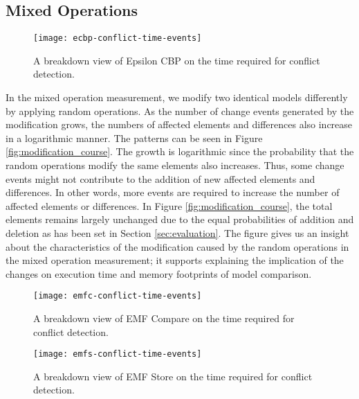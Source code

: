\vspace{-5pt}
\subsection{Mixed Operations}
\label{sec:mixed-operation_conflict}

\begin{wrapfigure}[14]{r}{0.5\textwidth}
  \vspace{-5pt}
  \texttt{[image: ecbp-conflict-time-events]}
  \caption{A breakdown view of Epsilon CBP on the time required for conflict detection.}
  \label{fig:ecbp-conflict-time-events}
\end{wrapfigure}

In the mixed operation measurement, we modify two identical models differently by applying random operations. As the number of change events generated by the modification grows, the numbers of affected elements and differences also increase in a logarithmic manner. The patterns can be seen in Figure \ref{fig:modification_course}. The growth is logarithmic since the probability that the random operations modify the same elements also increases. Thus, some change events might not contribute to the addition of new affected elements and differences. In other words, more events are required to increase the number of affected elements or differences. In Figure \ref{fig:modification_course}, the total elements remains largely unchanged due to the equal probabilities of addition and deletion as has been set in Section \ref{sec:evaluation}. The figure gives us an insight about the characteristics of the modification caused by the random operations in the mixed operation measurement; it supports explaining the implication of the changes on execution time and memory footprints of model comparison.

\begin{figure}[ht]
  \centering
  \begin{minipage}[b]{0.495\textwidth}
    \texttt{[image: emfc-conflict-time-events]}
    \caption{A breakdown view of EMF Compare on the time required for conflict detection.}
    \label{fig:emfc-conflict-time-events}
  \end{minipage}
  \hfill
  \begin{minipage}[b]{0.495\textwidth}
    \texttt{[image: emfs-conflict-time-events]}
    \caption{A breakdown view of EMF Store on the time required for conflict detection.}
    \label{fig:emfs-conflict-time-events}
  \end{minipage}
\end{figure}

